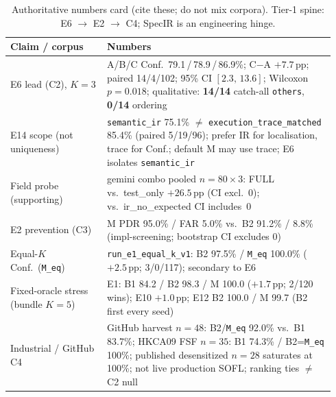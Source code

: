 \begin{table}[t]
  \centering
  \caption{Authoritative numbers card (cite these; do not mix corpora).
    Tier-1 spine: E6 $\to$ E2 $\to$ C4; SpecIR is an engineering hinge.}
  \label{tab:authoritative-numbers}
  \footnotesize
  \begin{tabular}{@{}p{0.28\linewidth}p{0.66\linewidth}@{}}
    \toprule
    \textbf{Claim / corpus} & \textbf{Numbers} \\
    \midrule
    E6 lead (C2), $K{=}3$
      & A/B/C Conf.\ 79.1\,/\,78.9\,/\,86.9\%;
        C$-$A ${+}7.7$\,pp; paired 14/4/102;
        95\% CI $[2.3,\,13.6]$; Wilcoxon $p{=}0.018$;
        qualitative: \textbf{14/14} catch-all \texttt{others},
        \textbf{0/14} ordering \\
    E14 scope (not uniqueness)
      & \texttt{semantic\_ir} 75.1\% $\neq$
        \texttt{execution\_trace\_matched} 85.4\%
        (paired 5/19/96);
        prefer IR for localisation, trace for Conf.;
        default M may use trace; E6 isolates \texttt{semantic\_ir} \\
    Field probe (supporting)
      & gemini combo pooled $n{=}80{\times}3$: FULL vs.\ test\_only
        ${+}26.5$\,pp (CI excl.~0); vs.\ ir\_no\_expected
        CI includes~0 \\
    E2 prevention (C3)
      & M PDR 95.0\% / FAR 5.0\% vs.\ B2 91.2\% / 8.8\%
        (impl-screening; bootstrap CI excludes 0) \\
    Equal-$K$ Conf.\ (\texttt{M\_eq})
      & \texttt{run\_e1\_equal\_k\_v1}: B2 97.5\% /
        \texttt{M\_eq} 100.0\% (${+}2.5$\,pp; 3/0/117);
        secondary to E6 \\
    Fixed-oracle stress (bundle $K{=}5$)
      & E1: B1 84.2 / B2 98.3 / M 100.0
        (${+}1.7$\,pp; 2/120 wins);
        E10 ${+}1.0$\,pp; E12 B2 100.0 / M 99.7
        (B2 first every seed) \\
    Industrial / GitHub C4
      & GitHub harvest $n{=}48$: B2/\texttt{M\_eq} 92.0\% vs.\ B1 83.7\%;
        HKCA09 FSF $n{=}35$: B1 74.3\% / B2=\texttt{M\_eq} 100\%;
        published desensitized $n{=}28$ saturates at 100\%;
        not live production SOFL; ranking ties $\neq$ C2 null \\
    \bottomrule
  \end{tabular}
\end{table}
